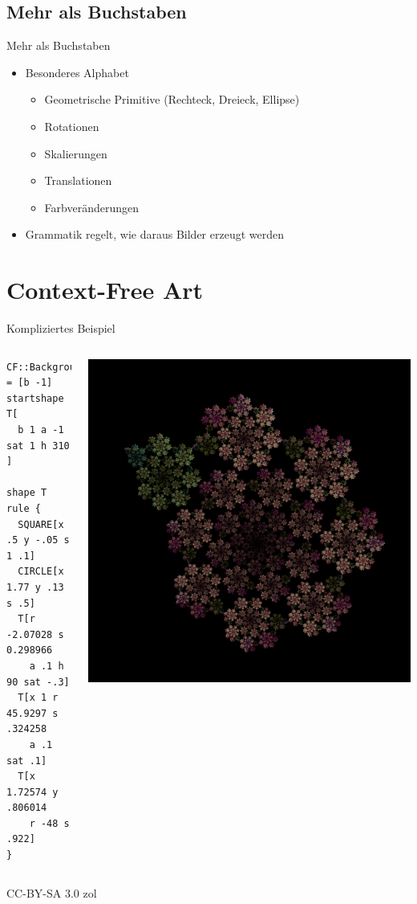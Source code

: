 \documentclass{beamer}
\theoremstyle{example}
\begin{document}
\subsection{Mehr als Buchstaben}
\begin{frame}{Mehr als Buchstaben}
  \begin{itemize}
  \item Besonderes Alphabet
    \begin{itemize}
    \item Geometrische Primitive (Rechteck, Dreieck, Ellipse)
    \item Rotationen
    \item Skalierungen
    \item Translationen
    \item Farbveränderungen
    \end{itemize}
  \item Grammatik regelt, wie daraus Bilder erzeugt werden
  \end{itemize}
\end{frame}

\section{Context-Free Art}
\begin{frame}[fragile]{Kompliziertes Beispiel}
\begin{columns}
\column{4cm}
\footnotesize{
\begin{lstlisting}
CF::Background = [b -1]
startshape T[
  b 1 a -1 sat 1 h 310
]

shape T
rule {
  SQUARE[x .5 y -.05 s 1 .1]
  CIRCLE[x 1.77 y .13 s .5]
  T[r -2.07028 s 0.298966
    a .1 h 90 sat -.3]
  T[x 1 r 45.9297 s .324258
    a .1 sat .1]
  T[x 1.72574 y .806014
    r -48 s .922]
} 
\end{lstlisting}
}
\column{6cm}
\hfill\includegraphics[width=\linewidth]{./images/beispiel.png}
\end{columns}
\tiny
\hfill CC-BY-SA 3.0 zol
\end{frame}
\end{document}

